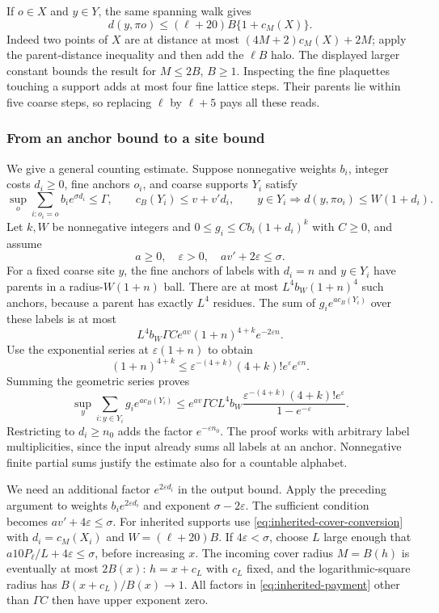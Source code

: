 If $o\in X$ and $y\in Y$, the same spanning walk gives
\begin{equation}\label{eq:inherited-anchor-distance}
 d(y,\pi o)\le(\ell+20)B\{1+c_M(X)\}.
\end{equation}
Indeed two points of $X$ are at distance at most
$(4M+2)c_M(X)+2M$; apply the parent-distance inequality and
then add the $\ell B$ halo. The displayed larger constant
bounds the result for $M\le2B$, $B\ge1$.
Inspecting the fine plaquettes touching a support adds at most
four fine lattice steps. Their parents lie within five coarse
steps, so replacing $\ell$ by $\ell+5$ pays all these reads.

\subsubsection{From an anchor bound to a site bound}
We give a general counting estimate. Suppose nonnegative weights
$b_i$, integer costs $d_i\ge0$, fine anchors $o_i$, and coarse
supports $Y_i$ satisfy
\[
 \sup_o\sum_{i:o_i=o}b_i e^{\sigma d_i}\le\Gamma,
 \qquad c_B(Y_i)\le v+v'd_i,
 \qquad y\in Y_i\Longrightarrow
 d(y,\pi o_i)\le W(1+d_i).
\]
Let $k,W$ be nonnegative integers and
$0\le g_i\le C b_i(1+d_i)^k$ with $C\ge0$, and assume
\begin{equation}\label{eq:inherited-reserve}
 a\ge0,\quad\varepsilon>0,\quad av'+2\varepsilon\le\sigma.
\end{equation}
For a fixed coarse site $y$, the fine anchors of labels with
$d_i=n$ and $y\in Y_i$ have parents in a radius-$W(1+n)$
ball. There are at most $L^4b_W(1+n)^4$ such anchors, because
a parent has exactly $L^4$ residues. The sum of $g_i e^{a c_B(Y_i)}$
over these labels is at most
\[
 L^4b_W\Gamma C e^{av}(1+n)^{4+k}e^{-2\varepsilon n}.
\]
Use the exponential series at $\varepsilon(1+n)$ to obtain
\[
 (1+n)^{4+k}\le
 \varepsilon^{-(4+k)}(4+k)!e^\varepsilon e^{\varepsilon n}.
\]
Summing the geometric series proves
\begin{equation}\label{eq:inherited-payment}
 \sup_y\sum_{i:y\in Y_i}g_i e^{a c_B(Y_i)}
 \le e^{av}\Gamma C L^4b_W
 \frac{\varepsilon^{-(4+k)}(4+k)!e^\varepsilon}
      {1-e^{-\varepsilon}}.
\end{equation}
Restricting to $d_i\ge n_0$ adds the factor
$e^{-\varepsilon n_0}$. The proof works with arbitrary label
multiplicities, since the input already sums all labels at an
anchor. Nonnegative finite partial sums justify the estimate
also for a countable alphabet.

We need an additional factor $e^{2\varepsilon d_i}$ in the
output bound. Apply the preceding argument to weights
$b_i e^{2\varepsilon d_i}$ and exponent $\sigma-2\varepsilon$.
The sufficient condition becomes $av'+4\varepsilon\le\sigma$.
For inherited supports use
\eqref{eq:inherited-cover-conversion} with
$d_i=c_M(X_i)$ and $W=(\ell+20)B$.
If $4\varepsilon<\sigma$, choose $L$ large enough that
$a10P_\ell/L+4\varepsilon\le\sigma$, before increasing $x$.
The incoming cover radius $M=B(h)$ is eventually at most $2B(x)$:
$h=x+c_L$ with $c_L$ fixed, and the logarithmic-square radius
has $B(x+c_L)/B(x)\to1$. All factors in
\eqref{eq:inherited-payment} other than $\Gamma C$ then have
upper exponent zero.

